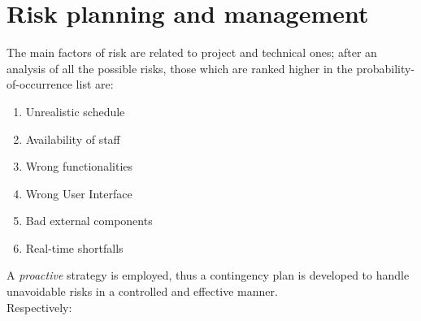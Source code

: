 \documentclass[a4paper,11pt]{report} %
\begin{document}
	\section{Risk planning and management}
		The main factors of risk are related to project and technical ones; after an analysis of all the possible risks, those which are ranked higher in the probability-of-occurrence list are:
		\begin{enumerate}
			\item Unrealistic schedule
			\item Availability of staff
			\item Wrong functionalities
			\item Wrong User Interface
			\item Bad external components
			\item Real-time shortfalls
		\end{enumerate}	
		A \textit{proactive} strategy is employed, thus a contingency plan is developed to handle unavoidable risks in a controlled and effective manner.\bigskip\\
		Respectively:
\end{document}
